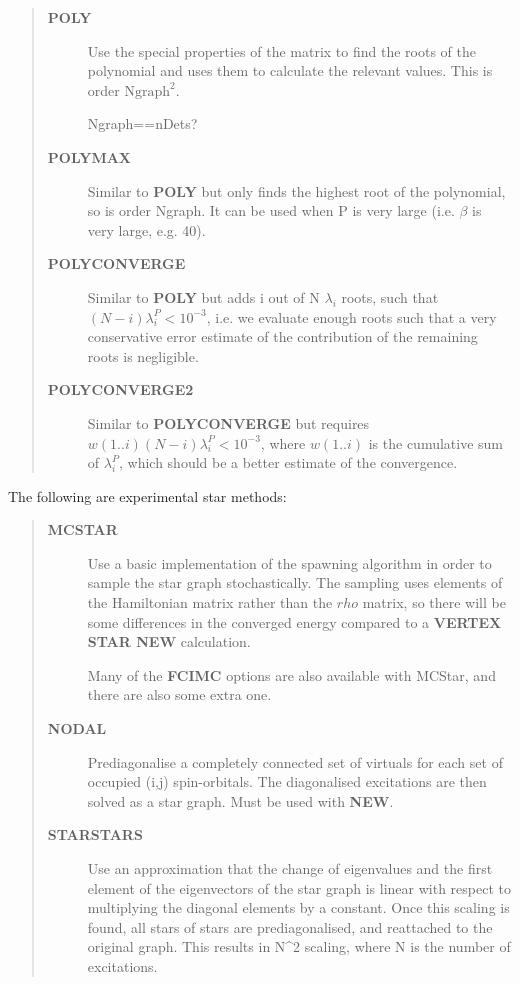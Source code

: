 \documentclass[openany,a4paper,10pt]{manual}
\begin{document}
\begin{description}
\begin{quote}
\begin{description}
\item[\textbf{POLY}]
Use the special properties of the matrix to find the roots of
the polynomial and uses them to calculate the relevant values.
This is order $\text{Ngraph}^2$.

\begin{notice}[note]
Ngraph==nDets?
\end{notice}

\item[\textbf{POLYMAX}]
Similar to \textbf{POLY} but only finds the highest root of the polynomial, so
is order Ngraph.  It can be used when P is very large (i.e. $\beta$
is very large, e.g. 40).

\item[\textbf{POLYCONVERGE}]
Similar to \textbf{POLY} but adds i out of N $\lambda_i$
roots, such that $(N-i) \lambda_i^P < 10^{-3}$, i.e. we
evaluate enough roots such that a very conservative error
estimate of the contribution of the remaining roots is
negligible.

\item[\textbf{POLYCONVERGE2}]
Similar to \textbf{POLYCONVERGE} but requires
$w(1..i) (N-i) \lambda_i^P < 10^{-3}$, where
$w(1..i)$ is the cumulative sum of $\lambda_i^P$,
which should be a better estimate of the convergence.

\end{description}
\end{quote}

The following are experimental star methods:
\begin{quote}
\begin{description}
\item[\textbf{MCSTAR}]
Use a basic implementation of the spawning algorithm in
order to sample the star graph stochastically. The sampling uses
elements of the Hamiltonian matrix rather than the $rho$ matrix,
so there will be some differences in the converged energy
compared to a \textbf{VERTEX STAR NEW} calculation.

Many of the \textbf{FCIMC} options are also available with MCStar,
and there are also some extra one.

\item[\textbf{NODAL}]
Prediagonalise a completely connected set of virtuals for each
set of occupied (i,j) spin-orbitals. The diagonalised
excitations are then solved as a star graph. Must be used
with \textbf{NEW}.

\item[\textbf{STARSTARS}]
Use an approximation that the change of eigenvalues and the
first element of the eigenvectors of the star graph is linear with
respect to multiplying the diagonal elements by a constant. Once
this scaling is found, all stars of stars are prediagonalised,
and reattached to the original graph. This results in N\textasciicircum{}2 scaling,
where N is the number of excitations.


\end{description}
\end{quote}
\end{description}
\end{document}
